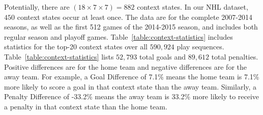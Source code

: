 \documentclass[]{article}
\begin{document}
Potentially, there are $(18 \times 7 \times 7) = 882$ context states. In our NHL dataset, $450$  context states occur at least once. The data are for the complete 2007-2014 seasons, as well as the first 512 games of the 2014-2015 season, and includes both regular season and playoff games. Table~\ref{table:context-statistics} includes statistics for the top-20 context states over all $590,924$ play sequences. Table~\ref{table:context-statistics} lists $52,793$ total goals and $89,612$ total penalties.
Positive differences are for the home team and negative differences are for the away team. For example, a Goal Difference of 7.1\% means the home team is 7.1\% more likely to score a goal in that context state than the away team. Similarly, a Penalty Difference of -33.2\% means the away team is 33.2\% more likely to receive a penalty in that context state than the home team.
\end{document}
